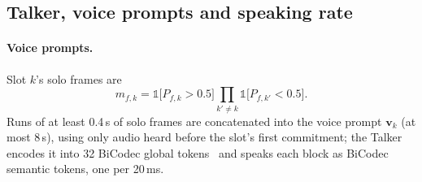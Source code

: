 \begin{table}[!htbp]
\centering\small
\setlength{\tabcolsep}{3pt}
\caption{The offline Thinker (initialisation of the deadline Thinker) and the per-direction simultaneous Thinkers
(En$\rightarrow$Zh / Zh$\rightarrow$En rows) used in the overlap study and to produce the PA Talkers' training text.}
\label{tab:hyper2}
\end{table}

\subsection{Talker, voice prompts and speaking rate}
\label{app:train-talker}

\paragraph{Voice prompts.} Slot $k$'s solo frames are
\begin{equation}
m_{f,k}=\mathds{1}\big[P_{f,k}>0.5\big]\textstyle\prod_{k'\neq k}\mathds{1}\big[P_{f,k'}<0.5\big].
\label{eq:alone}
\end{equation}
Runs of at least 0.4\,s of solo frames are concatenated into the voice prompt $\bm{v}_k$ (at most 8\,s), using only audio
heard before the slot's first commitment; the Talker encodes it into 32 BiCodec global tokens~\citep{wang2025spark} and
speaks each block as BiCodec semantic tokens, one per 20\,ms.

